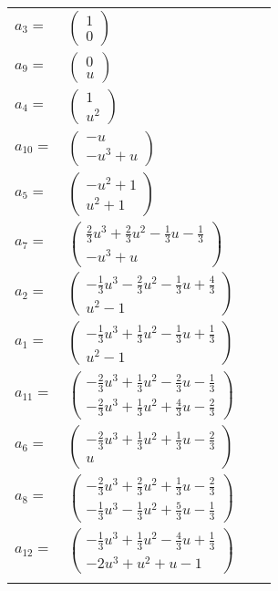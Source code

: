 \documentclass[1p]{elsarticle_modified}
\theoremstyle{definition}
\begin{document}
\begin{tabular}{m{7pt} m{180pt} m{7pt} m{180pt} }
\flushright $a_{3}=$&$\begin{pmatrix}1\\0\end{pmatrix}$ \\
\flushright $a_{9}=$&$\begin{pmatrix}0\\u\end{pmatrix}$ \\
\flushright $a_{4}=$&$\begin{pmatrix}1\\u^2\end{pmatrix}$ \\
\flushright $a_{10}=$&$\begin{pmatrix}- u\\- u^3+u\end{pmatrix}$ \\
\flushright $a_{5}=$&$\begin{pmatrix}- u^2+1\\u^2+1\end{pmatrix}$ \\
\flushright $a_{7}=$&$\begin{pmatrix}\frac{2}{3} u^3+\frac{2}{3} u^2-\frac{1}{3} u-\frac{1}{3}\\- u^3+u\end{pmatrix}$ \\
\flushright $a_{2}=$&$\begin{pmatrix}-\frac{1}{3} u^3-\frac{2}{3} u^2-\frac{1}{3} u+\frac{4}{3}\\u^2-1\end{pmatrix}$ \\
\flushright $a_{1}=$&$\begin{pmatrix}-\frac{1}{3} u^3+\frac{1}{3} u^2-\frac{1}{3} u+\frac{1}{3}\\u^2-1\end{pmatrix}$ \\
\flushright $a_{11}=$&$\begin{pmatrix}-\frac{2}{3} u^3+\frac{1}{3} u^2-\frac{2}{3} u-\frac{1}{3}\\-\frac{2}{3} u^3+\frac{1}{3} u^2+\frac{4}{3} u-\frac{2}{3}\end{pmatrix}$ \\
\flushright $a_{6}=$&$\begin{pmatrix}-\frac{2}{3} u^3+\frac{1}{3} u^2+\frac{1}{3} u-\frac{2}{3}\\u\end{pmatrix}$ \\
\flushright $a_{8}=$&$\begin{pmatrix}-\frac{2}{3} u^3+\frac{2}{3} u^2+\frac{1}{3} u-\frac{2}{3}\\-\frac{1}{3} u^3-\frac{1}{3} u^2+\frac{5}{3} u-\frac{1}{3}\end{pmatrix}$ \\
\flushright $a_{12}=$&$\begin{pmatrix}-\frac{1}{3} u^3+\frac{1}{3} u^2-\frac{4}{3} u+\frac{1}{3}\\-2 u^3+u^2+u-1\end{pmatrix}$\\&\end{tabular}
\end{document}
